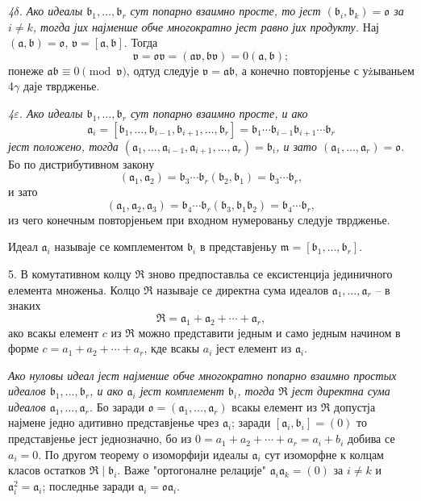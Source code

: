 \documentclass[11pt]{article}
\providecommand{\mR}{\mathfrak{R}}
\providecommand{\ma}{\mathfrak{a}}
\providecommand{\mb}{\mathfrak{b}}
\providecommand{\mm}{\mathfrak{m}}
\providecommand{\mo}{\mathfrak{o}}
\providecommand{\mv}{\mathfrak{v}}
\begin{document}
\emph{4$\delta$. Ако идеалы $\mb_1,\ldots,\mb_r$ сут попарно взаимно просте, то јест $(\mb_i,\mb_k)=\mo$ за $i\ne k$, тогда јих најменше обче многократно јест равно јих продукту.} Нај $(\ma,\mb)=\mo$, $\mv=[\ma,\mb]$. Тогда
\[
\mv=\mo\mv=(\ma\mv,\mb\mv)=0(\ma,\mb);
\]
понеже $\ma\mb\equiv0\pmod{\mv}$, одтуд следује $\mv=\ma\mb$, а конечно повторјенье с уżываньем 4$\gamma$ даје тврдженье.

\emph{4$\varepsilon$. Ако идеалы $\mb_1,\ldots,\mb_r$ сут попарно взаимно просте, и ако}
\[
\ma_i=[\mb_1,\ldots,\mb_{i-1},\mb_{i+1},\ldots,\mb_r]
=\mb_1\cdots\mb_{i-1}\mb_{i+1}\cdots\mb_r
\]
\emph{јест положено, тогда $(\ma_1,\ldots,\ma_{i-1},\ma_{i+1},\ldots,\ma_r)=\mb_i$, и зато $(\ma_1,\ldots,\ma_r)=\mo$.} Бо по дистрибутивном закону
\[
(\ma_1,\ma_2)=\mb_3\cdots\mb_r(\mb_2,\mb_1)=\mb_3\cdots\mb_r,
\]
и зато
\[
(\ma_1,\ma_2,\ma_3)=\mb_4\cdots\mb_r(\mb_3,\mb_1\mb_2)=\mb_4\cdots\mb_r,
\]
из чего конечным повторјеньем при входном нумерованьу следује тврдженье.

Идеал $\ma_i$ называје се комплементом $\mb_i$ в представјеньу $\mm=[\mb_1,\ldots,\mb_r]$.

5. В комутативном колцу $\mR$ зново предпоставльа се ексистенција јединичного елемента множеньа. Колцо $\mR$ называје се директна сума идеалов $\ma_1,\ldots,\ma_r$ -- в знаких
\[
\mR=\ma_1+\ma_2+\cdots+\ma_r,
\]
ако всакы елемент $c$ из $\mR$ можно представити једным и само једным начином в форме $c=a_1+a_2+\cdots+a_r$, кде всакы $a_i$ јест елемент из $\ma_i$.

\emph{Ако нуловы идеал јест најменше обче многократно попарно взаимно простых идеалов $\mb_1,\ldots,\mb_r$, и ако $\ma_i$ јест комплемент $\mb_i$, тогда $\mR$ јест директна сума идеалов $\ma_1,\ldots,\ma_r$.} Бо заради $\mo=(\ma_1,\ldots,\ma_r)$ всакы елемент из $\mR$ допустја најмене једно адитивно представјенье чрез $\ma_i$; заради $[\ma_i,\mb_i]=(0)$ то представјенье јест једнозначно, бо из $0=a_1+a_2+\cdots+a_r=a_i+b_i$ добива се $a_i=0$. По другом теорему о изоморфији идеалы $\ma_i$ сут изоморфне к колцам класов остатков $\mR\mid\mb_i$. Важе "ортогоналне релације" $\ma_i\ma_k=(0)$ за $i\ne k$ и $\ma_i^2=\ma_i$; последнье заради $\ma_i=\mo\ma_i$.
\end{document}
